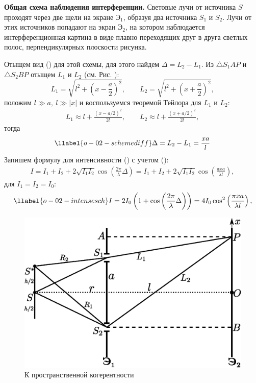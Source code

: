 \textbf{Общая схема наблюдения интерференции.}
Световые лучи от источника $S$ проходят через две щели на экране $\text{Э}_1$, образуя два источника $S_1$ и $S_2$. Лучи от этих источников попадают на экран $\text{Э}_2$, на котором наблюдается интерференционная картина в виде плавно переходящих друг в друга светлых полос, перпендикулярных плоскости рисунка.

Отыщем вид () для этой схемы, для этого найдем $\Delta = L_2 - L_1$. Из
$\triangle S_1AP$ и $\triangle S_2BP$ отыщем $L_1$ и $L_2$ (см. Рис. ):
$$
L_1 = \sqrt{l^2 + \left(x-\frac{a}{2}\right)^2}, \qquad
L_2 = \sqrt{l^2 + \left(x+\frac{a}{2}\right)^2},
$$
положим $l \gg a, \ l \gg |x|$ и воспользуемся теоремой Тейлора для $L_1$ и $L_2$:
\begin{gather*}
L_1 \approx l + \frac{\left(x-a/2\right)^2}{2l}, \qquad
L_2 \approx l + \frac{\left(x+a/2\right)^2}{2l},
\end{gather*}
тогда
\begin{gather}
\llabel{o-02-schemediff}
\displaystyle \Delta = L_2 - L_1 = \frac{xa}{l}
\end{gather}
Запишем формулу для интенсивности () с учетом ():
\begin{gather*}
I = I_1 + I_2 + 2\sqrt{I_1 I_2}\cos\left(\frac{2\pi}{\lambda}\Delta\right) =
    I_1 + I_2 + 2\sqrt{I_1 I_2}\cos\left(\frac{\pi x a}{\lambda l}\right),
\end{gather*}
для $I_1 = I_2 = I_0$:
\begin{gather}
\llabel{o-02-intensesch}
I = 2I_0\left(1 + \cos\left(\frac{2\pi}{\lambda}\Delta\right)\right) =
4I_0\cos^2\left(\frac{\pi xa}{\lambda l}\right),
\end{gather}

\begin{figure}
	\includegraphics[width=1\linewidth]{img/o-02_1}{}
	\caption{К пространственной когерентности}
\end{figure}

